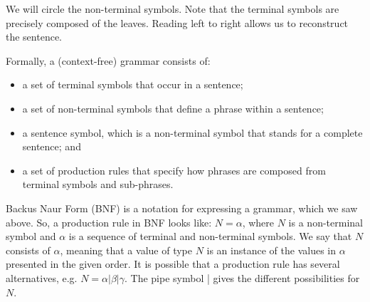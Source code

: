 \documentclass[a4paper, openany]{memoir}
\begin{document}
\noindent We will circle the non-terminal symbols. Note that the terminal symbols are precisely composed of the leaves. Reading left to right allows us to reconstruct the sentence.

Formally, a (context-free) grammar consists of:
\begin{itemize}
    \item a set of terminal symbols that occur in a sentence;
    \item a set of non-terminal symbols that define a phrase within a sentence;
    \item a sentence symbol, which is a non-terminal symbol that stands for a complete sentence; and
    \item a set of production rules that specify how phrases are composed from terminal symbols and sub-phrases.
\end{itemize}

Backus Naur Form (BNF) is a notation for expressing a grammar, which we saw above. So, a production rule in BNF looks like: $N = \alpha$, where $N$ is a non-terminal symbol and $\alpha$ is a sequence of terminal and non-terminal symbols. We say that $N$ consists of $\alpha$, meaning that a value of type $N$ is an instance of the values in $\alpha$ presented in the given order. It is possible that a production rule has several alternatives, e.g. $N = \alpha | \beta | \gamma$. The pipe symbol | gives the different possibilities for $N$.
\end{document}
